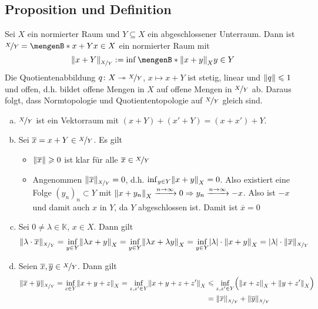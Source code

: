 \subsection[Proposition und Definition: Norm auf dem Quotientenraum]{Proposition und Definition} %
\label{sub:213}
Sei $X$ ein normierter Raum und $Y \subseteq X$ ein abgeschlossener Unterraum. Dann ist $\nicefrac{X}{Y} = \set[x +Y]{x \in X}$ ein normierter Raum mit
\[
	\norm[\nicefrac{X}{Y}]{x +Y} := \inf \set[{\norm[X]{x+y} }]{y \in Y}  
\]
Die Quotientenabbildung $q \colon X \twoheadrightarrow \nicefrac{X}{Y}$, $x \mapsto x+ Y$ ist stetig, linear und $\norm{q} \le 1$ und offen, d.h. bildet offene Mengen in $X$ auf offene Mengen in $\nicefrac{X}{Y}$ ab.
Daraus folgt, dass Normtopologie und Quotiententopologie auf $\nicefrac{X}{Y}$ gleich sind.
\begin{enumerate}[a)]
	\item $\nicefrac{X}{Y}$ ist ein Vektorraum mit $(x+Y) + (x'+Y) = (x+x') + Y$.
	\item Sei $\overline{x} = x+ Y \in \nicefrac{X}{Y}$. Es gilt
	\begin{itemize}
		\item $\norm{\overline{x}} \ge 0 $ ist klar für alle $\overline{x} \in \nicefrac{X}{Y}$
		\item Angenommen $\norm[\nicefrac{X}{Y}]{\overline{x}} =0$, d.h. $\inf_{y \in Y} \norm[X]{x+y} =0$. Also existiert eine Folge $(y_n)_n \subset Y$ mit
		$\norm[X]{x+y_n} \xrightarrow{n \to \infty} 0 \Rightarrow y_n \xrightarrow{n \to \infty} -x$. Also ist $-x$ und damit auch $x$ in $Y$, da $Y$ abgeschlossen ist.
		Damit ist $\overline{x}=0 $ 
	\end{itemize}
	\item Sei $0 \not= \lambda \in \mathds{K}$, $x \in X$. Dann gilt
	\begin{align*}
		\norm[\nicefrac{X}{Y}]{\lambda \cdot \overline{x}} = \inf_{y \in Y} \norm[X]{\lambda x + y} = \inf_{y \in Y} \norm[X]{\lambda x + \lambda y} 
		= \inf_{y \in Y} \abs*{\lambda } \cdot \norm[X]{x+y}  =   \abs*{\lambda } \cdot \norm[\nicefrac{X}{Y}]{\overline{x}}  
	\end{align*}
	\item Seien $\overline{x}, \overline{y} \in \nicefrac{X}{Y}$. Dann gilt
	\begin{align*}
		\norm[\nicefrac{X}{Y}]{\overline{x} + \overline{y}} = \inf_{z \in Y} \norm[X]{x+y+z} = \inf_{z,z' \in Y} \norm[X]{x+y+z+z'} &\le \inf_{z,z' \in Y}
		\enbrace[\Big]{\norm[X]{x+z} + \norm[X]{y+z'}} \\ &= \norm[\nicefrac{X}{Y}]{\overline{x}} + \norm[\nicefrac{X}{Y}]{\overline{y}}

\end{align*}
\end{enumerate}
